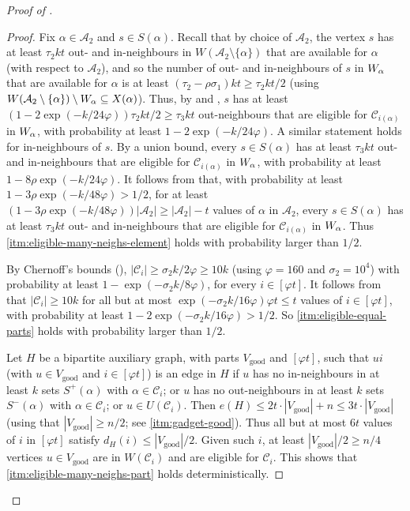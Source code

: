 \documentclass[english]{article}
\theoremstyle{plain}
\theoremstyle{remark}
\def\C{\mathcal{C}}
\let\phi\varphi
\def \Sp {S^+}
\def \Sm {S^-}
\def \Vg {V_{\good}}
\newcommand{\sm}{\setminus}
\newcommand{\A}{\mathcal{A}}
\DeclareMathOperator{\good}{good}
\begin{document}
\begin{proof}[Proof of ]
\begin{proof}
			Fix $\alpha \in \A_2$ and $s \in S(\alpha)$. Recall that by choice of $\A_2$, the vertex $s$ has at least $\tau_2 kt$ out- and in-neighbours in $W(\A_2 \setminus \{\alpha\})$ that are available for $\alpha$ (with respect to $\A_2$), and so the number of out- and in-neighbours of $s$ in $W_{\alpha}$ that are available for $\alpha$ is at least $(\tau_2 - \rho \sigma_1)kt \ge \tau_2 kt / 2$ (using $W(\A_2 \setminus \{\alpha\}) \sm \Wa \subseteq X(\alpha)$). Thus, by  and , $s$ has at least  $(1 - 2\exp(-k/24\phi)) \tau_2 kt / 2 \ge \tau_3 kt$ out-neighbours that are eligible for $\C_{i(\alpha)}$ in $W_{\alpha}$, with probability at least $1 - 2\exp(-k/24\phi)$. A similar statement holds for in-neighbours of $s$.
			By a union bound, every $s \in S(\alpha)$ has at least $\tau_3 kt$ out- and in-neighbours that are eligible for $\C_{i(\alpha)}$ in $W_{\alpha}$, with probability at least $1 - 8\rho  \exp(-k/24\phi)$. 
			It follows from  that, with probability at least $1 - 3\rho\exp(-k/48\phi) > 1/2$, for at least $(1 - 3\rho\exp(-k/48\phi))|\A_2| \ge |\A_2| - t$ values of $\alpha$ in $\A_2$, every $s \in S(\alpha)$ has at least $\tau_3 kt$ out- and in-neighbours that are eligible for $\C_{i(\alpha)}$ in $W_{\alpha}$. Thus \ref{itm:eligible-many-neighs-element} holds with probability larger than $1/2$.

			By Chernoff's bounds (), $|\C_i| \ge \sigma_2 k / 2\phi \ge 10k$ (using $\phi = 160$ and $\sigma_2 = 10^4$) with probability at least $1 - \exp(-\sigma_2 k/8\phi)$, for every $i \in [\phi t]$. It follows from  that $|\C_i| \ge 10k$ for all but at most $\exp(-\sigma_2 k / 16\phi) \phi t \le t$ values of $i \in [\phi t]$, with probability at least $1 - 2\exp(-\sigma_2 k / 16\phi) > 1/2$. So \ref{itm:eligible-equal-parts} holds with probability larger than $1/2$.

			Let $H$ be a bipartite auxiliary graph, with parts $\Vg$ and $[\phi t]$, such that $ui$ (with $u \in \Vg$ and $i \in [\phi t]$) is an edge in $H$ if $u$ has no in-neighbours in at least $k$ sets $\Sp(\alpha)$ with $\alpha \in \C_i$; or $u$ has no out-neighbours in at least $k$ sets $\Sm(\alpha)$ with $\alpha \in \C_i$; or $u \in U(\C_i)$. Then $e(H) \le 2t \cdot |\Vg| + n \le 3t \cdot |\Vg|$ (using that $|\Vg| \ge n/2$; see \ref{itm:gadget-good}). Thus all but at most $6t$ values of $i$ in $[\phi t]$ satisfy $d_H(i) \le |\Vg|/2$. Given such $i$, at least $|\Vg|/2 \ge n/4$ vertices $u \in \Vg$ are in $W(\C_i)$ and are eligible for $\C_i$.
			This shows that \ref{itm:eligible-many-neighs-part} holds deterministically.


\end{proof}
\end{proof}
\end{document}
